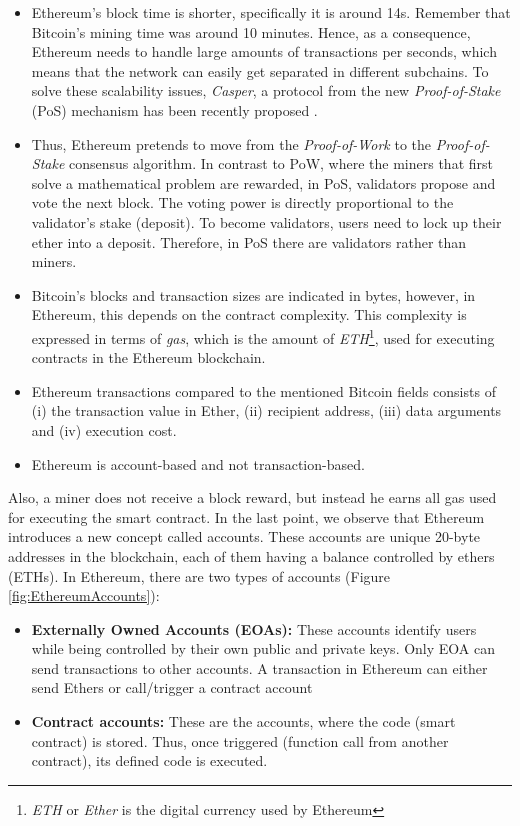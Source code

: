 \begin{itemize}
	
	\item Ethereum's block time is shorter, specifically it is around 14s. Remember that Bitcoin's mining time was around 10 minutes. Hence, as a consequence, Ethereum needs to handle large amounts of transactions per seconds, which means that the network can easily get separated in different subchains. To solve these scalability issues, \textit{Casper}, a protocol from the new \textit{Proof-of-Stake} (PoS) mechanism has been recently proposed \cite{proofOfStake}.
	\item Thus, Ethereum pretends to move from the \textit{Proof-of-Work} to the \textit{Proof-of-Stake} consensus algorithm. In contrast to PoW, where the miners that first solve a mathematical problem are rewarded, in PoS, validators propose and vote the next block. The voting power is directly proportional to the validator's stake (deposit). To become validators, users need to lock up their ether into a deposit. Therefore, in PoS there are validators rather than miners.
	\item Bitcoin's blocks and transaction sizes are indicated in bytes, however, in Ethereum, this depends on the contract complexity. This complexity is expressed in terms of \textit{gas}, which is the amount of \textit{ETH}\footnote{\textit{ETH} or \textit{Ether} is the digital currency used by Ethereum}, used for executing contracts in the Ethereum blockchain. 

	\item Ethereum transactions compared to the mentioned Bitcoin fields consists of (i) the transaction value in Ether, (ii) recipient address, (iii) data arguments and (iv) execution cost.
	\item Ethereum is account-based and not transaction-based.
\end{itemize}
Also, a miner does not receive a block reward, but instead he earns all gas used for executing the smart contract.
In the last point, we observe that Ethereum introduces a new concept called accounts. These accounts are unique 20-byte addresses in the blockchain, each of them having a balance controlled by ethers (ETHs). In Ethereum, there are two types of accounts (Figure \ref{fig:EthereumAccounts}):

\begin{itemize}
	
	\item \textbf{Externally Owned Accounts (EOAs):} These accounts identify users while being controlled by their own public and private keys. Only EOA can send transactions to other accounts. A transaction in Ethereum can either send Ethers or call/trigger a contract account  
	\item \textbf{Contract accounts:} These are the accounts, where the code (smart contract) is stored. Thus, once triggered (function call from another contract), its defined code is executed.
\end{itemize}

